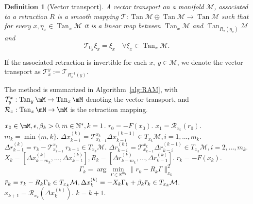 \documentclass{article} %
\newtheorem{definition}{Definition}[section]
\numberwithin{equation}{subsection}
\numberwithin{theorem}{section}
\newcommand{\cR}{\mathcal{R}}
\newcommand{\cT}{\mathcal{T}}
\newcommand{\cM}{\mathcal{M}}
\newcommand{\TM}[1]{T_{#1}\mathcal{M}}
\newcommand{\dx}[2]{\Delta x_{#1}^{(#2)}}
\newcommand{\dr}[2]{\Delta r_{#1}^{(#2)}}
\begin{document}
        \begin{definition}[Vector transport]
        A vector transport on a manifold $\mathcal{M}$, associated to a retraction $R$ is a smooth mapping $\cT: \operatorname{Tan}\mathcal{M} \oplus \operatorname{Tan}\mathcal{M}
            \to \operatorname{Tan}\mathcal{M}$
        such that for every $x, \eta_x \in \operatorname{Tan}_x\cM$ it is a linear map between 
            $\operatorname{Tan}_x\cM$ and $\operatorname{Tan}_{R_{x}(\eta_x)}\cM$ and
        \begin{equation}
            \mathcal{T}_{0_x}\xi_x = \xi_x\quad \forall \xi_x \in \operatorname{Tan}_x\mathcal{M}.
        \end{equation}
    \end{definition}
    If the associated retraction is invertible for each $x,\ y \in \cM$, we denote the vector transport as $\cT_{x}^{y} := \cT_{R_x^{-1}(y)}$.

    
    The method is summarized in Algorithm~\ref{alg:RAM}, with $\mathcal{T}_y^x: \operatorname{Tan}_y\mM \to \operatorname{Tan}_x\mM$ denoting the vector transport, and $\mathcal{R}_x: \operatorname{Tan}_x\mM \to \mM$ is the retraction mapping.
            \begin{algorithm}[ht]
            \caption{Riemannian Anderson Mixing Method}
            \label{alg:RAM}
            \begin{algorithmic}[1]
                \REQUIRE $x_0 \in\mM, \epsilon, \beta_k > 0, m\in\mathbb{N}^*, k = 1$.
                \STATE $r_0 = - F(x_0)$.
                \STATE $x_1 = \cR_{x_0}(r_0)$.
                \STATE $m_k = \min\{m,k\}$.
                \STATE $\dx{k-i}{k} = \cT_{x_{k-1}}^{x_k}\dx{k-i}{k-1} \in\TM{x_k}, i = 1,\ldots,m_k$.
                \STATE $\dr{k-1}{k} = r_k-\cT_{x_{k-1}}^{x_k}\ r_{k-1}\in\TM{x_k}$.
                \STATE $\dr{k-i}{k} = \cT_{x_{k-1}}^{x_k}\dr{k-i}{k-1} \in\TM{x_k}, i = 2,\ldots,m_k$.
                \ENDIF
                \STATE $X_k = [\dx{k-m_k}{k},\ldots,\dx{k-1}{k}], R_k = [\dr{k-m_k}{k},\ldots,\dr{k-1}{k}]$.
                \STATE $r_k = -F(x_k)$.
                \STATE \begin{equation}\label{eq:RAM_lsq}
                    \Gamma_k = \arg\min_{\Gamma\in\mathbb{R}^{m_k}}\|r_k-R_k\Gamma\|^2_{x_k}
                \end{equation}
                \STATE $\Bar{r}_k = r_k-R_k\Gamma_k\in\TM{x_k}, \dx{k}{k} = -X_k\Gamma_k+\beta_k\Bar{r}_k \in\TM{x_k}$.
                \STATE $x_{k+1} = \cR_{x_k}(\dx{k}{k})$.
                \STATE $k = k+1$.
                \ENDWHILE
            \end{algorithmic}
        \end{algorithm}
\end{document}
